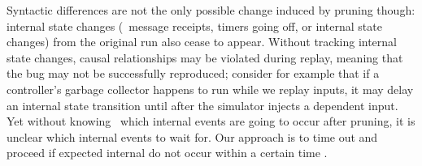 Syntactic differences are not the
only possible change induced by pruning though: internal state changes
(\eg~message receipts, timers going off, or internal state
changes) from the original
run also cease to appear.
Without tracking internal state changes, causal relationships may be violated during replay,
meaning that the bug may not be successfully reproduced;
consider for example that if a controller's garbage collector happens to run
while we replay inputs, it may delay an internal state transition until
after the simulator injects a dependent input.
Yet without knowing \apriori~which internal events are going to occur after
pruning, it is unclear which internal events to wait for. Our approach is to time out and proceed
if expected internal do not occur within a certain time \textepsilon.

